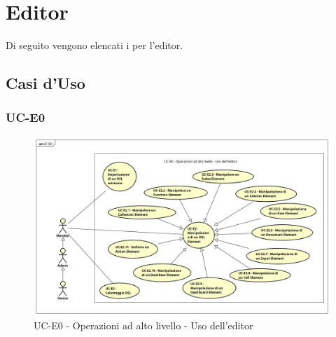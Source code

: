 \section{Editor}

Di seguito vengono elencati i  per l'editor.

\subsection{Casi d'Uso}


\subsubsection{UC-E0}

    \begin{figure}[H]
      \begin{center}
        \includegraphics[width=12cm]{res/img/UCEditor/UC-E0.png}
      \caption{UC-E0 - Operazioni ad alto livello - Uso dell'editor}
      \end{center} 
    \end{figure}    
    
